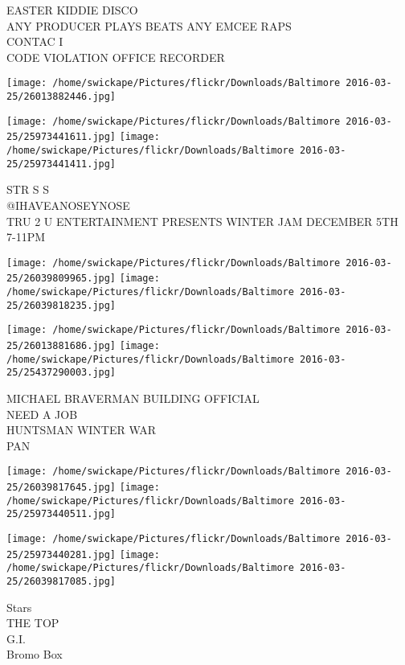 \documentclass[10pt,letterpaper]{article}
\begin{document}
EASTER KIDDIE DISCO\\
ANY PRODUCER PLAYS BEATS ANY EMCEE RAPS\\
CONTAC I\\
CODE VIOLATION OFFICE RECORDER\\
\pagebreak

\texttt{[image: /home/swickape/Pictures/flickr/Downloads/Baltimore 2016-03-25/26013882446.jpg]}

\vspace{0.25in}
\texttt{[image: /home/swickape/Pictures/flickr/Downloads/Baltimore 2016-03-25/25973441611.jpg]}
\texttt{[image: /home/swickape/Pictures/flickr/Downloads/Baltimore 2016-03-25/25973441411.jpg]}

STR S S\\
@IHAVEANOSEYNOSE\\
TRU 2 U ENTERTAINMENT PRESENTS WINTER JAM DECEMBER 5TH 7{-}11PM\\
\pagebreak

\texttt{[image: /home/swickape/Pictures/flickr/Downloads/Baltimore 2016-03-25/26039809965.jpg]}
\texttt{[image: /home/swickape/Pictures/flickr/Downloads/Baltimore 2016-03-25/26039818235.jpg]}

\texttt{[image: /home/swickape/Pictures/flickr/Downloads/Baltimore 2016-03-25/26013881686.jpg]}
\texttt{[image: /home/swickape/Pictures/flickr/Downloads/Baltimore 2016-03-25/25437290003.jpg]}

MICHAEL BRAVERMAN BUILDING OFFICIAL\\
NEED A JOB\\
HUNTSMAN WINTER WAR\\
PAN\\
\pagebreak

\texttt{[image: /home/swickape/Pictures/flickr/Downloads/Baltimore 2016-03-25/26039817645.jpg]}
\texttt{[image: /home/swickape/Pictures/flickr/Downloads/Baltimore 2016-03-25/25973440511.jpg]}

\texttt{[image: /home/swickape/Pictures/flickr/Downloads/Baltimore 2016-03-25/25973440281.jpg]}
\texttt{[image: /home/swickape/Pictures/flickr/Downloads/Baltimore 2016-03-25/26039817085.jpg]}

Stars\\
THE TOP\\
G.I.\\
Bromo Box\\
\pagebreak
\end{document}
